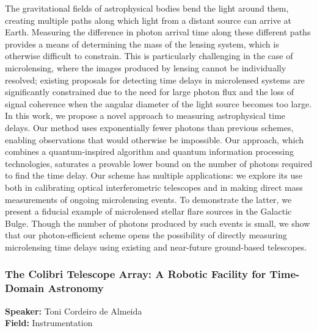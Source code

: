 The gravitational fields of astrophysical bodies bend the light around them, creating multiple paths along which light from a distant source can arrive at Earth. Measuring the difference in photon arrival time along these different paths provides a means of determining the mass of the lensing system, which is otherwise difficult to constrain. This is particularly challenging in the case of microlensing, where the images produced by lensing cannot be individually resolved; existing proposals for detecting time delays in microlensed systems are significantly constrained due to the need for large photon flux and the loss of signal coherence when the angular diameter of the light source becomes too large. In this work, we propose a novel approach to measuring astrophysical time delays. Our method uses exponentially fewer photons than previous schemes, enabling observations that would otherwise be impossible. Our approach, which combines a quantum-inspired algorithm and quantum information processing technologies, saturates a provable lower bound on the number of photons required to find the time delay. Our scheme has multiple applications: we explore its use both in calibrating optical interferometric telescopes and in making direct mass measurements of ongoing microlensing events. To demonstrate the latter, we present a fiducial example of microlensed stellar flare sources in the Galactic Bulge. Though the number of photons produced by such events is small, we show that our photon-efficient scheme opens the possibility of directly measuring microlensing time delays using existing and near-future ground-based telescopes.

\hypertarget{abstract-talk-265}{}\label{abstract-page-talk-265}
\subsubsection*{The Colibri Telescope Array: A Robotic Facility for Time-Domain Astronomy}
\textbf{Speaker:} Toni Cordeiro de Almeida\\
\textbf{Field:} Instrumentation

